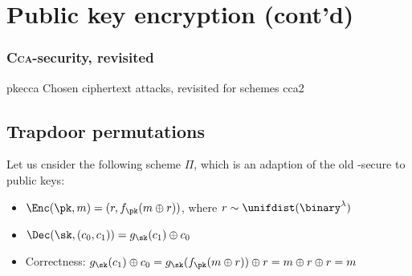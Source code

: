 \section{Public key encryption (cont'd)} 

\subsubsection{\textsc{Cca}-security, revisited}

\begin{cryptogame}
    {pkecca}
    {Chosen ciphertext attacks, revisited for \pke{} schemes}
    {cca2}
    

    \cseqdelay
    \cseqbeginloop


    \cseqendloop
    \cseqdelay



    \cseqdelay
    \cseqbeginloop


    \cseqendloop
    \cseqdelay

\end{cryptogame}

\subsection{Trapdoor permutations}

Let us cnsider the following scheme $\Pi$, which is an adaption of the old \cpa-secure \ske{} to public keys:
\begin{itemize}
    \item $\Enc(\pk, m) = (r, f_\pk(m \oplus r))$, where $r \sim \unifdist(\binary^\lambda)$
    \item $\Dec(\sk, (c_0, c_1)) = g_\sk(c_1) \oplus c_0$
    \item Correctness: $g_\sk(c_1) \oplus c_0 = g_\sk(f_\pk (m \oplus r)) \oplus r = m \oplus r \oplus r = m$
\end{itemize}

